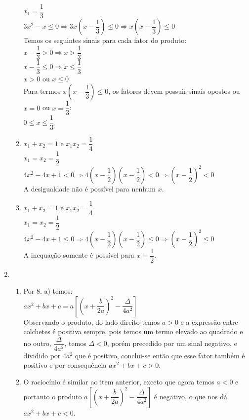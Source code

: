 \documentclass[10pt]{book}
\begin{document}
\begin{enumerate}
\begin{enumerate}
			$x_{1}=\dfrac{1}{3}$\\[6pt]
			$3x^2-x \leq 0 \Rightarrow 3x(x-\dfrac{1}{3})\leq 0 \Rightarrow x(x-\dfrac{1}{3})\leq 0$\\[6pt]
			Temos os seguintes sinais para cada fator do produto:\\
			$x-\dfrac{1}{3} > 0 \Rightarrow x>\dfrac{1}{3}$\\[6pt]
			$x-\dfrac{1}{3} \leq 0 \Rightarrow x \leq \dfrac{1}{3}$\\[6pt]
			$x > 0$ ou $x \leq 0$\\
			Para termos $ x(x-\dfrac{1}{3})\leq 0$, os fatores devem possuir sinais opostos ou $x = 0$ ou $x = \dfrac{1}{3}$:\\[6pt]
			$0 \leq x \leq \dfrac{1}{3}$
			\item %
			$x_{1}+x_{2}=1$ e $x_{1}x_{2}=\dfrac{1}{4}$\\[6pt]
			$x_{1} = x_{2}= \dfrac{1}{2}$\\[6pt]
			$4x^2 - 4x + 1 < 0 \Rightarrow 4(x - \dfrac{1}{2})(x - \dfrac{1}{2}) < 0 \Rightarrow (x - \dfrac{1}{2})^2 < 0$\\[6pt]
			A desigualdade não é possível para nenhum $x$.
			\item %
			$x_{1}+x_{2}= 1$ e $x_{1}x_{2}=\dfrac{1}{4} $\\[6pt]
			$x_{1} = x_{2}= \dfrac{1}{2}$\\[6pt]
			$4x^2 - 4x + 1 \leq 0 \Rightarrow 4(x - \dfrac{1}{2})(x - \dfrac{1}{2}) \leq 0 \Rightarrow (x - \dfrac{1}{2})^2 \leq 0$\\[6pt]
			A inequação somente é possível para $x=\dfrac{1}{2}$.
		\end{enumerate}
	\item %
		\begin{enumerate}
			\item %
			Por 8. a) temos:\\
			$ax^2+bx+c = a\left[\left(x+\dfrac{b}{2a}\right)^2-\dfrac{\Delta}{4a^2}\right]$\\[6pt]
			Observando o produto, do lado direito temos $a > 0$ e a expressão entre colchetes é positiva sempre, pois temos um termo elevado ao quadrado e no outro, $\dfrac{\Delta}{4a^2}$, temos $\Delta < 0$, porém precedido por um sinal negativo, e dividido por $4a^2$ que é positivo, conclui-se então que esse fator também é positivo e por consequência $ax^2+bx+c > 0$.
			\item %
			O raciocínio é similar ao item anterior, exceto que agora temos $a < 0$ e portanto o produto $a\left[\left(x+\dfrac{b}{2a}\right)^2-\dfrac{\Delta}{4a^2}\right]$ é negativo, o que nos dá  $ax^2+bx+c < 0$.

\end{enumerate}
\end{enumerate}
\end{document}
